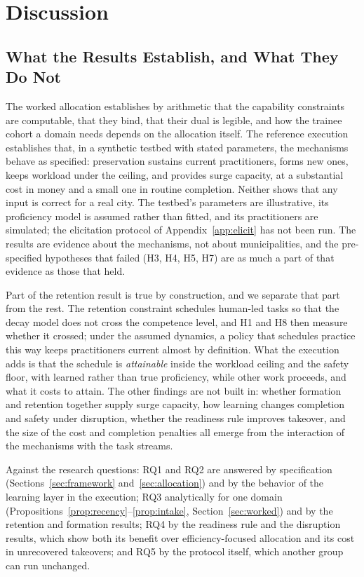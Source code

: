 \documentclass[utf8]{FrontiersinHarvard}
\begin{document}
	\section{Discussion}
	\label{sec:discussion}

	\subsection{What the Results Establish, and What They Do Not}
	\label{sec:whatworked}

	The worked allocation establishes by arithmetic that the capability constraints are computable, that they bind, that their dual is legible, and how the trainee cohort a domain needs depends on the allocation itself. The reference execution establishes that, in a synthetic testbed with stated parameters, the mechanisms behave as specified: preservation sustains current practitioners, forms new ones, keeps workload under the ceiling, and provides surge capacity, at a substantial cost in money and a small one in routine completion. Neither shows that any input is correct for a real city. The testbed's parameters are illustrative, its proficiency model is assumed rather than fitted, and its practitioners are simulated; the elicitation protocol of Appendix~\ref{app:elicit} has not been run. The results are evidence about the mechanisms, not about municipalities, and the pre-specified hypotheses that failed (H3, H4, H5, H7) are as much a part of that evidence as those that held.

	Part of the retention result is true by construction, and we separate that part from the rest. The retention constraint schedules human-led tasks so that the decay model does not cross the competence level, and H1 and H8 then measure whether it crossed; under the assumed dynamics, a policy that schedules practice this way keeps practitioners current almost by definition. What the execution adds is that the schedule is \textit{attainable} inside the workload ceiling and the safety floor, with learned rather than true proficiency, while other work proceeds, and what it costs to attain. The other findings are not built in: whether formation and retention together supply surge capacity, how learning changes completion and safety under disruption, whether the readiness rule improves takeover, and the size of the cost and completion penalties all emerge from the interaction of the mechanisms with the task streams.

	Against the research questions: RQ1 and RQ2 are answered by specification (Sections~\ref{sec:framework} and~\ref{sec:allocation}) and by the behavior of the learning layer in the execution; RQ3 analytically for one domain (Propositions~\ref{prop:recency}--\ref{prop:intake}, Section~\ref{sec:worked}) and by the retention and formation results; RQ4 by the readiness rule and the disruption results, which show both its benefit over efficiency-focused allocation and its cost in unrecovered takeovers; and RQ5 by the protocol itself, which another group can run unchanged.
\end{document}
